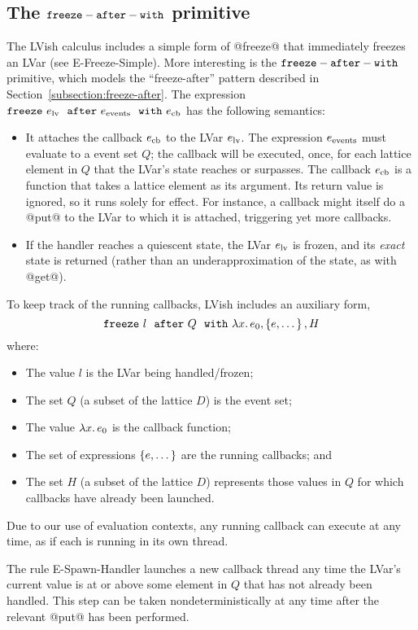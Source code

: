 \subsection{The ${\mbox{\texttt{freeze}}-\mbox{\texttt{after}}-\mbox{\texttt{with}}}$ primitive}\label{subsection:language-freezing}

The LVish calculus includes a simple form of @freeze@ that immediately
freezes an LVar (see {\sc E-Freeze-Simple}).  More interesting is the
${\mbox{\texttt{freeze}}-\mbox{\texttt{after}}-\mbox{\texttt{with}}}$ primitive, which models the ``freeze-after'' pattern described
in Section~\ref{subsection:freeze-after}.  The expression
$\mbox{\texttt{freeze}}~e_{\rm lv}~~{\mbox{\texttt{after}}}~e_{\rm events}~~{\mbox{\texttt{with}}}~e_{\rm cb}$ has the
following semantics:
\begin{itemize}
\item It attaches the callback $e_{\rm cb}$ to the LVar $e_{\rm lv}$.
  The expression $e_{\rm events}$ must evaluate to a event set $Q$;
  the callback will be executed, once, for each lattice element in $Q$
  that the LVar's state reaches or surpasses.  The callback $e_{\rm
    cb}$ is a function that takes a lattice element as its argument.
  Its return value is ignored, so it runs solely for effect.  For
  instance, a callback might itself do a @put@ to the LVar to which it
  is attached, triggering yet more callbacks.
\item If the handler reaches a quiescent state, the LVar $e_{\rm lv}$
  is frozen, and its \emph{exact} state is returned (rather than an
  underapproximation of the state, as with @get@).
\end{itemize}

To keep track of the running callbacks, LVish includes an auxiliary form,
\[
\mbox{\texttt{freeze}}~l~~{\mbox{\texttt{after}}}~Q~~{\mbox{\texttt{with}}}~\lambda x.\,e_0, \left\{e, \dots\right\}, H
\]
where:
\begin{itemize}
\item The value $l$ is the LVar being handled/frozen;
\item The set $Q$ (a subset of the lattice $D$) is the event set;
\item The value $\lambda x.\,e_0$ is the callback function;
\item The set of expressions $\left\{e, \dots\right\}$ are the running
  callbacks; and
\item The set $H$ (a subset of the lattice $D$) represents those
  values in $Q$ for which callbacks have already been launched.
\end{itemize}
Due to our use of evaluation contexts, any running callback can
execute at any time, as if each is running in its own thread.

The rule {\sc E-Spawn-Handler} launches a new callback thread any time
the LVar's current value is at or above some element in $Q$ that has
not already been handled.  This step can be taken nondeterministically
at any time after the relevant @put@ has been performed.

